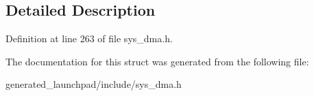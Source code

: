 \subsection{Detailed Description}


Definition at line 263 of file sys\+\_\+dma.\+h.



The documentation for this struct was generated from the following file\+:\begin{DoxyCompactItemize}
\item 
generated\+\_\+launchpad/include/sys\+\_\+dma.\+h\end{DoxyCompactItemize}
